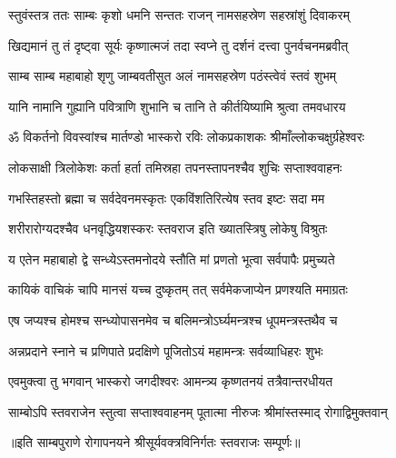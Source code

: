 


\twolineshloka
{स्तुवंस्तत्र ततः साम्बः कृशो धमनि सन्ततः}
{राजन् नामसहस्रेण सहस्रांशुं दिवाकरम्} %

\twolineshloka
{खिद्यमानं तु तं दृष्ट्वा सूर्यः कृष्णात्मजं तदा}
{स्वप्ने तु दर्शनं दत्त्वा पुनर्वचनमब्रवीत्} %


\twolineshloka
{साम्ब साम्ब महाबाहो शृणु जाम्बवतीसुत}
{अलं नामसहस्रेण पठंस्त्वेवं स्तवं शुभम्} %

\twolineshloka
{यानि नामानि गुह्यानि पवित्राणि शुभानि च}
{तानि ते कीर्तयिष्यामि श्रुत्वा तमवधारय} %

\twolineshloka
{ॐ विकर्तनो विवस्वांश्च मार्तण्डो भास्करो रविः}
{लोकप्रकाशकः श्रीमाँल्लोकचक्षुर्ग्रहेश्वरः} %

\twolineshloka
{लोकसाक्षी त्रिलोकेशः कर्ता हर्ता तमिस्रहा}
{तपनस्तापनश्चैव शुचिः सप्ताश्ववाहनः} %

\twolineshloka
{गभस्तिहस्तो ब्रह्मा च सर्वदेवनमस्कृतः}
{एकविंशतिरित्येष स्तव इष्टः सदा मम} %

\twolineshloka
{शरीरारोग्यदश्चैव धनवृद्धियशस्करः}
{स्तवराज इति ख्यातस्त्रिषु लोकेषु विश्रुतः} %

\twolineshloka
{य एतेन महाबाहो द्वे सन्ध्येऽस्तमनोदये}
{स्तौति मां प्रणतो भूत्वा सर्वपापैः प्रमुच्यते} %

\twolineshloka
{कायिकं वाचिकं चापि मानसं यच्च दुष्कृतम्}
{तत् सर्वमेकजाप्येन प्रणश्यति ममाग्रतः} %

\twolineshloka
{एष जप्यश्च होमश्च सन्ध्योपासनमेव च}
{बलिमन्त्रोऽर्घ्यमन्त्रश्च धूपमन्त्रस्तथैव च} %

\twolineshloka
{अन्नप्रदाने स्नाने च प्रणिपाते प्रदक्षिणे}
{पूजितोऽयं महामन्त्रः सर्वव्याधिहरः शुभः} %

\twolineshloka
{एवमुक्त्वा तु भगवान् भास्करो जगदीश्वरः}
{आमन्त्र्य कृष्णतनयं तत्रैवान्तरधीयत} %

\twolineshloka
{साम्बोऽपि स्तवराजेन स्तुत्वा सप्ताश्ववाहनम्}
{पूतात्मा नीरुजः श्रीमांस्तस्माद् रोगाद्विमुक्तवान्} %


॥इति साम्बपुराणे रोगापनयने श्रीसूर्यवक्त्रविनिर्गतः स्तवराजः सम्पूर्णः॥
